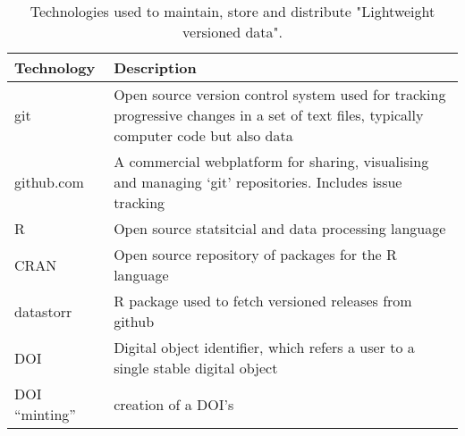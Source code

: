 \documentclass[a4paper,11pt]{article}
\begin{document}
\newpage

\begin{table}[h!]
\centering
\caption{Technologies used to maintain, store and distribute "Lightweight versioned data".}
{\footnotesize
\vspace{1cm}
  \begin{tabular}{p{5cm}p{10cm}}
  \hline
  \textbf{Technology} & \textbf{Description} \\\hline
   git & Open source version control system used for tracking progressive changes in a set of text files, typically computer code but also data\\
   github.com & A commercial webplatform for sharing, visualising and managing `git' repositories. Includes issue tracking\\
   R     &  Open source statsitcial and data processing language \\
   CRAN  &  Open source repository of packages for the R language \\
   datastorr & R package used to fetch versioned releases from github  \\
   DOI & Digital object identifier, which refers a user to a single stable digital object \\ 
   DOI ``minting'' & creation of a DOI's \\
   \hline
  \end{tabular}
  }
\label{tab:technologies}
\end{table}

\newpage
\end{document}
